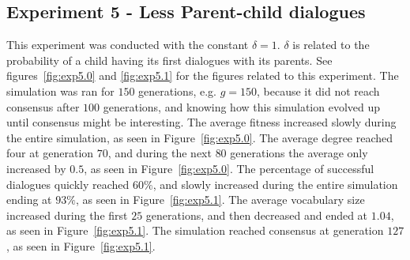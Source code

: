 \clearpage
\subsection{Experiment 5 - Less Parent-child dialogues}
This experiment was conducted with the constant $\delta = 1$. $\delta$ is related to the probability of a child having its first dialogues with its parents. See figures~\ref{fig:exp5.0} and \ref{fig:exp5.1} for the figures related to this experiment. The simulation was ran for $150$ generations, e.g. $g = 150$, because it did not reach consensus after $100$ generations, and knowing how this simulation evolved up until consensus might be interesting. The average fitness increased slowly during the entire simulation, as seen in Figure~\ref{fig:exp5.0}. The average degree reached four at generation $70$, and during the next $80$ generations the average only increased by $0.5$, as seen in Figure~\ref{fig:exp5.0}. The percentage of successful dialogues quickly reached $60\%$, and slowly increased during the entire simulation ending at $93\%$, as seen in Figure~\ref{fig:exp5.1}. The average vocabulary size increased during the first $25$ generations, and then decreased and ended at $1.04$, as seen in Figure~\ref{fig:exp5.1}. The simulation reached consensus at generation $127$, as seen in Figure~\ref{fig:exp5.1}.

